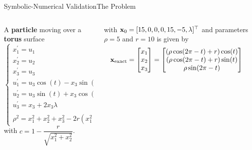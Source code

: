 \begin{frame}{Symbolic-Numerical Validation}{The Problem}
  \begin{columns}
    \begin{column}[t]{0.425\textwidth}
      A \textbf{particle} moving over a \textbf{torus} surface%
      \begin{equation*}
        \label{chap4:eq:torus}
        \begin{cases}
          x^{\prime}_{1} = u_{1} \\
          x^{\prime}_{2} = u_{2} \\
          x^{\prime}_{3} = u_{3} \\
          u^{\prime}_{1} = u_{3}\cos(t) - x_{3}\sin(t) - u_{2} + 2 c x_{1}\lambda \\
          u^{\prime}_{2} = u_{3}\sin(t) + x_{3}\cos(t) + u_{1} + 2 c x_{2}\lambda \\
          u^{\prime}_{3} = x_{3} + 2x_{3}\lambda \\
          \rho^2 = x_{1}^2 + x_{2}^2 + x_{3}^2 - 2r(x_{1}^2 + x_{2}^2)^{1/2} + r^2
        \end{cases}
      \end{equation*}
      with $c = 1 - \dfrac{r}{\sqrt{x_{1}^2 + x_{2}^2}}$.
    \end{column}
    \begin{column}[t]{0.575\textwidth}
      \vspace{-3.0em}
      with $\mathbf{x}_{0} = [15, 0, 0, 0, 15, -5, \lambda]^{\top}$ and parameters $\rho = 5$ and $r = 10$ is given by
      \begin{equation*}
        \mathbf{x}_\text{exact} = \begin{bmatrix}
          x_{1} \\ x_{2} \\ x_{3}
        \end{bmatrix} = \begin{bmatrix}
          (\rho \cos(2\pi - t) + r) \cos(t) \\
          (\rho \cos(2\pi - t) + r) \sin(t) \\
          \rho \sin(2\pi - t)
        \end{bmatrix}
      \end{equation*} \\[-3.0em]
      \centering{\begin{tikzpicture}
        \begin{axis}[
          xtick=\empty, ytick=\empty, ztick=\empty,
          axis line style={draw=none},
          tick style={draw=none},
          axis equal,
          view={100}{40}]

\end{axis}
\end{tikzpicture}}
\end{column}
\end{columns}
\end{frame}

